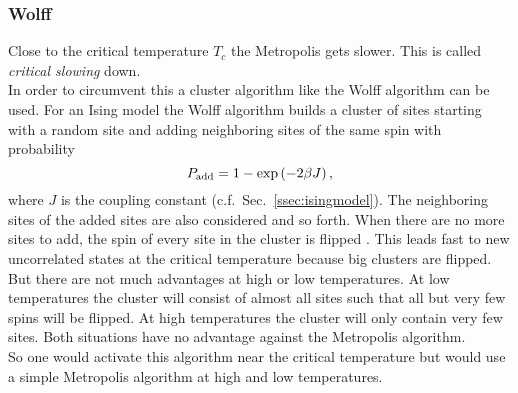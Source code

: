     \subsubsection{Wolff}
    \label{sssec:wolff}
        Close to the critical temperature \(T_c\) the Metropolis
        gets slower. This is called \emph{critical slowing} down.\\
        In order to circumvent this a cluster algorithm like the Wolff
        algorithm \cite{Wolff1989} can be used.
        For an Ising model the Wolff algorithm builds a cluster of sites
        starting with a random site and adding neighboring sites of the
        same spin with probability
        \begin{equation}
            P_{\mathrm{add}} = 1-\exp\left(-2\beta J\right),
            \label{eq:wolffAdd}
        \end{equation}
        where \(J\) is the coupling constant (c.f.\ Sec.\ \ref{ssec:isingmodel}).
        The neighboring sites of the added sites
        are also considered and so forth. When there are no more sites
        to add, the spin of every site in the cluster is flipped
        \cite[p. 91ff]{NewmanBarkema1999} \cite[p. 151f]{Katzgraber2011}.
        This leads fast to new uncorrelated states at the critical
        temperature because big clusters are flipped. But there are not
        much advantages at high or low temperatures. At low temperatures
        the cluster will consist of almost all sites such that all but
        very few spins will be flipped. At high temperatures the cluster
        will only contain very few sites.
        Both situations have no advantage against the Metropolis algorithm.\\
        So one would activate this algorithm near the critical temperature
        but would use a simple Metropolis algorithm at high and low temperatures.

